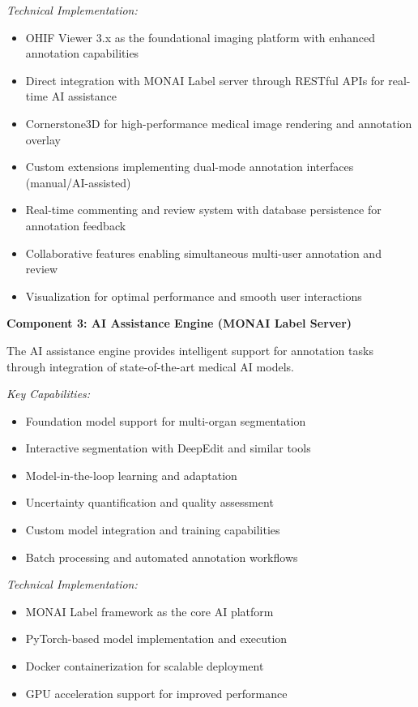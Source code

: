 \textit{Technical Implementation:}
\begin{itemize}
    \item OHIF Viewer 3.x as the foundational imaging platform with enhanced annotation capabilities
    \item Direct integration with MONAI Label server through RESTful APIs for real-time AI assistance
    \item Cornerstone3D for high-performance medical image rendering and annotation overlay
    \item Custom extensions implementing dual-mode annotation interfaces (manual/AI-assisted)
    \item Real-time commenting and review system with database persistence for annotation feedback
    \item Collaborative features enabling simultaneous multi-user annotation and review
    \item Visualization for optimal performance and smooth user interactions
\end{itemize}

\textbf{Component 3: AI Assistance Engine (MONAI Label Server)}

The AI assistance engine provides intelligent support for annotation tasks through integration of state-of-the-art medical AI models.

\textit{Key Capabilities:}
\begin{itemize}
    \item Foundation model support for multi-organ segmentation
    \item Interactive segmentation with DeepEdit and similar tools
    \item Model-in-the-loop learning and adaptation
    \item Uncertainty quantification and quality assessment
    \item Custom model integration and training capabilities
    \item Batch processing and automated annotation workflows
\end{itemize}

\textit{Technical Implementation:}
\begin{itemize}
    \item MONAI Label framework as the core AI platform
    \item PyTorch-based model implementation and execution
    \item Docker containerization for scalable deployment
    \item GPU acceleration support for improved performance
\end{itemize}

